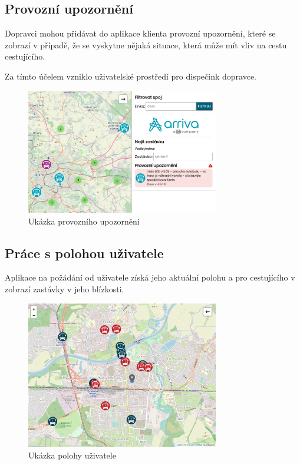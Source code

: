 \subsection{Provozní upozornění}
Dopravci mohou přidávat do aplikace klienta provozní upozornění, které se zobrazí v případě, že se vyskytne nějaká situace, která může mít vliv na cestu cestujícího.\par
Za tímto účelem vzniklo uživatelské prostředí pro dispečink dopravce.
\par
\begin{figure}[H]
    \centering
    \includegraphics[width=0.75\textwidth]{images/global_arriva_event.png}
    \caption{Ukázka provozního upozornění}
    \label{upozorneni}
\end{figure}
\subsection{Práce s polohou uživatele}
Aplikace na požádání od uživatele získá jeho aktuální polohu a pro cestujícího v zobrazí zastávky v jeho blízkosti.

\begin{figure}[H]
    \centering
    \includegraphics[width=0.75\textwidth]{images/position.png}
    \caption{Ukázka polohy uživatele}
    \label{poloha}
\end{figure}
